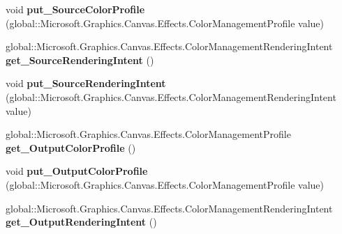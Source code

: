 \begin{DoxyCompactItemize}
void {\bfseries put\+\_\+\+Source\+Color\+Profile} (global\+::\+Microsoft.\+Graphics.\+Canvas.\+Effects.\+Color\+Management\+Profile value)
\item 
\mbox{\label{interface_microsoft_1_1_graphics_1_1_canvas_1_1_effects_1_1_i_color_management_effect_aa7388e8ab03296386d33f1faf0617131}} 
global\+::\+Microsoft.\+Graphics.\+Canvas.\+Effects.\+Color\+Management\+Rendering\+Intent {\bfseries get\+\_\+\+Source\+Rendering\+Intent} ()
\item 
\mbox{\label{interface_microsoft_1_1_graphics_1_1_canvas_1_1_effects_1_1_i_color_management_effect_aa7e9dbcbb6bca52b58c9c59dea51a272}} 
void {\bfseries put\+\_\+\+Source\+Rendering\+Intent} (global\+::\+Microsoft.\+Graphics.\+Canvas.\+Effects.\+Color\+Management\+Rendering\+Intent value)
\item 
\mbox{\label{interface_microsoft_1_1_graphics_1_1_canvas_1_1_effects_1_1_i_color_management_effect_a6fac8f330f6ff6d98ef14cef1e6f5663}} 
global\+::\+Microsoft.\+Graphics.\+Canvas.\+Effects.\+Color\+Management\+Profile {\bfseries get\+\_\+\+Output\+Color\+Profile} ()
\item 
\mbox{\label{interface_microsoft_1_1_graphics_1_1_canvas_1_1_effects_1_1_i_color_management_effect_a9dd341e021ce085924bf27decaeaaf6e}} 
void {\bfseries put\+\_\+\+Output\+Color\+Profile} (global\+::\+Microsoft.\+Graphics.\+Canvas.\+Effects.\+Color\+Management\+Profile value)
\item 
\mbox{\label{interface_microsoft_1_1_graphics_1_1_canvas_1_1_effects_1_1_i_color_management_effect_a1a0a5108efc4f507ad103a59c30284a8}} 
global\+::\+Microsoft.\+Graphics.\+Canvas.\+Effects.\+Color\+Management\+Rendering\+Intent {\bfseries get\+\_\+\+Output\+Rendering\+Intent} ()
\item 
\mbox{\label{interface_microsoft_1_1_graphics_1_1_canvas_1_1_effects_1_1_i_color_management_effect_ac8cbecd84f1efff87ca7977bdb11871b}} 

\end{DoxyCompactItemize}
